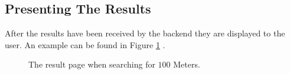\subsection{Presenting The Results}

After the results have been received by the backend they are displayed to the user. An example can be found in Figure \ref{fig:frontres} .

\begin{figure}
  \caption{The result page when searching for $100$ Meters. }
  \label{fig:frontres}
\end{figure}
